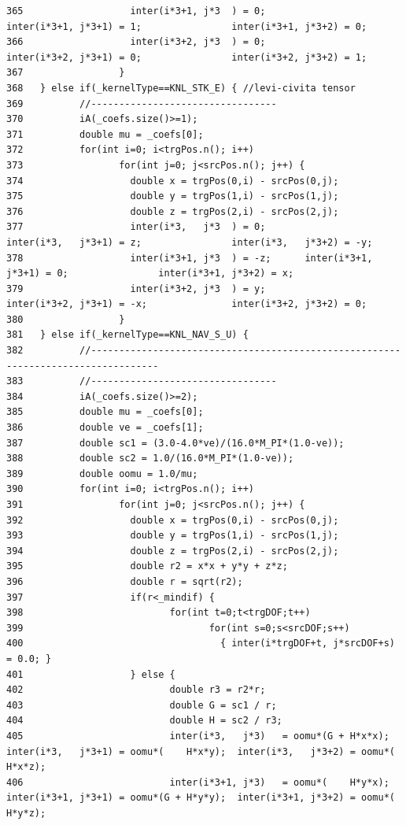 \begin{verbatim}
365                   inter(i*3+1, j*3  ) = 0;               inter(i*3+1, j*3+1) = 1;                inter(i*3+1, j*3+2) = 0;
366                   inter(i*3+2, j*3  ) = 0;               inter(i*3+2, j*3+1) = 0;                inter(i*3+2, j*3+2) = 1;
367                 }
368   } else if(_kernelType==KNL_STK_E) { //levi-civita tensor
369          //---------------------------------
370          iA(_coefs.size()>=1);
371          double mu = _coefs[0];
372          for(int i=0; i<trgPos.n(); i++)
373                 for(int j=0; j<srcPos.n(); j++) {
374                   double x = trgPos(0,i) - srcPos(0,j);
375                   double y = trgPos(1,i) - srcPos(1,j);
376                   double z = trgPos(2,i) - srcPos(2,j);
377                   inter(i*3,   j*3  ) = 0;               inter(i*3,   j*3+1) = z;                inter(i*3,   j*3+2) = -y;
378                   inter(i*3+1, j*3  ) = -z;      inter(i*3+1, j*3+1) = 0;                inter(i*3+1, j*3+2) = x;
379                   inter(i*3+2, j*3  ) = y;               inter(i*3+2, j*3+1) = -x;               inter(i*3+2, j*3+2) = 0;
380                 }
381   } else if(_kernelType==KNL_NAV_S_U) {
382          //----------------------------------------------------------------------------------
383          //---------------------------------
384          iA(_coefs.size()>=2);
385          double mu = _coefs[0];
386          double ve = _coefs[1];
387          double sc1 = (3.0-4.0*ve)/(16.0*M_PI*(1.0-ve));
388          double sc2 = 1.0/(16.0*M_PI*(1.0-ve));
389          double oomu = 1.0/mu;
390          for(int i=0; i<trgPos.n(); i++)
391                 for(int j=0; j<srcPos.n(); j++) {
392                   double x = trgPos(0,i) - srcPos(0,j);
393                   double y = trgPos(1,i) - srcPos(1,j);
394                   double z = trgPos(2,i) - srcPos(2,j);
395                   double r2 = x*x + y*y + z*z;
396                   double r = sqrt(r2);
397                   if(r<_mindif) {
398                          for(int t=0;t<trgDOF;t++)
399                                 for(int s=0;s<srcDOF;s++)
400                                   { inter(i*trgDOF+t, j*srcDOF+s) = 0.0; }
401                   } else {
402                          double r3 = r2*r;
403                          double G = sc1 / r;
404                          double H = sc2 / r3;
405                          inter(i*3,   j*3)   = oomu*(G + H*x*x);  inter(i*3,   j*3+1) = oomu*(    H*x*y);  inter(i*3,   j*3+2) = oomu*(    H*x*z);
406                          inter(i*3+1, j*3)   = oomu*(    H*y*x);  inter(i*3+1, j*3+1) = oomu*(G + H*y*y);  inter(i*3+1, j*3+2) = oomu*(    H*y*z);

\end{verbatim}
